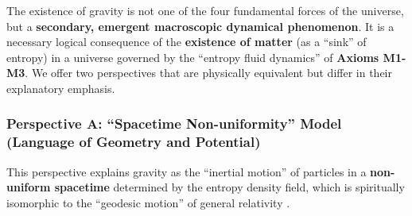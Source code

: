 \documentclass[11pt, a4paper]{article}
\begin{document}
The existence of gravity is not one of the four fundamental forces of the universe, but a \textbf{secondary, emergent macroscopic dynamical phenomenon}. It is a necessary logical consequence of the \textbf{existence of matter} (as a ``sink'' of entropy) in a universe governed by the ``entropy fluid dynamics'' of \textbf{Axioms M1-M3}. We offer two perspectives that are physically equivalent but differ in their explanatory emphasis.

\subsubsection*{Perspective A: ``Spacetime Non-uniformity'' Model (Language of Geometry and Potential)}

This perspective explains gravity as the ``inertial motion'' of particles in a \textbf{non-uniform spacetime} determined by the entropy density field, which is spiritually isomorphic to the ``geodesic motion'' of general relativity \cite{Einstein1905}.
\end{document}
